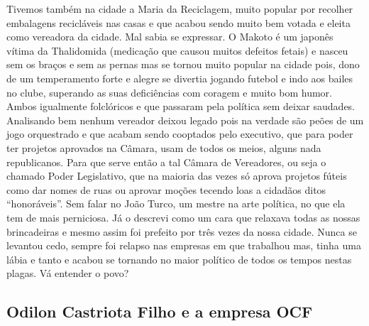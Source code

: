 \documentclass[12pt,brazil,]{book}
\begin{document}
Tivemos também na cidade a Maria da Reciclagem, muito popular por
recolher embalagens recicláveis nas casas e que acabou sendo muito bem
votada e eleita como vereadora da cidade. Mal sabia se expressar. O
Makoto é um japonês vítima da Thalidomida (medicação que causou muitos
defeitos fetais) e nasceu sem os braços e sem as pernas mas se tornou
muito popular na cidade pois, dono de um temperamento forte e alegre se
divertia jogando futebol e indo aos bailes no clube, superando as suas
deficiências com coragem e muito bom humor. Ambos igualmente folclóricos
e que passaram pela política sem deixar saudades. Analisando bem nenhum
vereador deixou legado pois na verdade são peões de um jogo orquestrado
e que acabam sendo cooptados pelo executivo, que para poder ter projetos
aprovados na Câmara, usam de todos os meios, alguns nada republicanos.
Para que serve então a tal Câmara de Vereadores, ou seja o chamado Poder
Legislativo, que na maioria das vezes só aprova projetos fúteis como dar
nomes de ruas ou aprovar moções tecendo loas a cidadãos ditos
``honoráveis''. Sem falar no João Turco, um mestre na arte política, no
que ela tem de mais perniciosa. Já o descrevi como um cara que relaxava
todas as nossas brincadeiras e mesmo assim foi prefeito por três vezes
da nossa cidade. Nunca se levantou cedo, sempre foi relapso nas empresas
em que trabalhou mas, tinha uma lábia e tanto e acabou se tornando no
maior político de todos os tempos nestas plagas. Vá entender o povo?

\subsection{Odilon Castriota Filho e a empresa
OCF}\label{odilon-castriota-filho-e-a-empresa-ocf}
\end{document}

